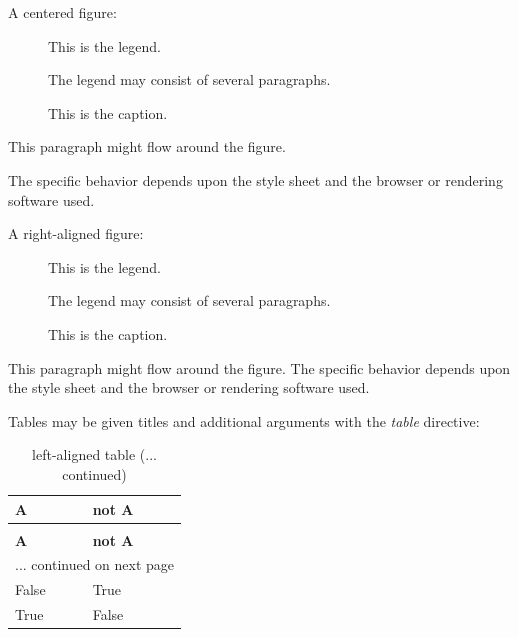 \documentclass[a4paper]{article}
\newlength{\DUtablewidth} %
\newenvironment{DUlegend}{\small}{}
\begin{document}
A centered figure:

\begin{figure}
\noindent{}
\caption{This is the caption.}
\begin{DUlegend}
This is the legend.

The legend may consist of several paragraphs.
\end{DUlegend}
\end{figure}

This paragraph might flow around the figure.

The specific behavior depends upon the style sheet and the browser or
rendering software used.

A right-aligned figure:

\begin{figure} %
\noindent{}
\caption{This is the caption.}
\begin{DUlegend}
This is the legend.

The legend may consist of several paragraphs.
\end{DUlegend}
\end{figure}

This paragraph might flow around the figure. The specific behavior depends
upon the style sheet and the browser or rendering software used.

Tables may be given titles and additional arguments with the \emph{table}
directive:

\setlength{\DUtablewidth}{\linewidth}
\begin{longtable}[l]{|p{0.075\DUtablewidth}|p{0.075\DUtablewidth}|}
\caption{left-aligned table}\\
\hline
\textbf{%
A
} & \textbf{%
not A
} \\
\hline
\endfirsthead
\caption[]{left-aligned table (... continued)}\\
\hline
\textbf{%
A
} & \textbf{%
not A
} \\
\hline
\endhead
\multicolumn{2}{c}{\hfill ... continued on next page} \\
\endfoot
\endlastfoot

False
 & 
True
 \\
\hline

True
 & 
False
 \\
\hline
\end{longtable}
\end{document}
